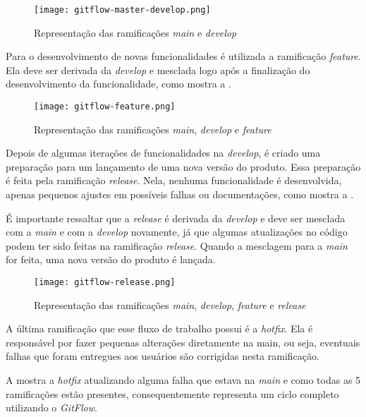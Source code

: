 \begin{figure}[!htb]
    \centering
    \texttt{[image: gitflow-master-develop.png]}
    \caption{Representação das ramificações \textit{main} e \textit{develop}}
    \label{fig:gitflow1}
\end{figure}

Para o desenvolvimento de novas funcionalidades é utilizada a ramificação \textit{feature}. Ela deve ser derivada da \textit{develop} e mesclada logo após a finalização do desenvolvimento da funcionalidade, como mostra a .

\begin{figure}[!htb]
    \centering
    \texttt{[image: gitflow-feature.png]}
    \caption{Representação das ramificações \textit{main}, \textit{develop} e \textit{feature}}
    \label{fig:gitflow2}
\end{figure}

Depois de algumas iterações de funcionalidades na \textit{develop}, é criado uma preparação para um lançamento de uma nova versão do produto. Essa preparação é feita pela ramificação \textit{release}. Nela, nenhuma funcionalidade é desenvolvida, apenas pequenos ajustes em possíveis falhas ou documentações, como mostra a .

É importante ressaltar que a \textit{release} é derivada da \textit{develop} e deve ser mesclada com a \textit{main} e com a  \textit{develop} novamente, já que algumas atualizações no código podem ter sido feitas na ramificação \textit{release}. Quando a mesclagem para a \textit{main} for feita, uma nova versão do produto é lançada.

\begin{figure}[!htb]
    \centering
    \texttt{[image: gitflow-release.png]}
    \caption{Representação das ramificações \textit{main}, \textit{develop}, \textit{feature} e \textit{release}}
    \label{fig:gitflow3}
\end{figure}

A última ramificação que esse fluxo de trabalho possui é a \textit{hotfix}. Ela é responsável por fazer pequenas alterações diretamente na main, ou seja, eventuais falhas que foram entregues aos usuários são corrigidas nesta ramificação.

A   mostra a \textit{hotfix} atualizando alguma falha que estava na \textit{main} e como todas as 5 ramificações estão presentes, consequentemente representa um ciclo completo utilizando o \textit{GitFlow}.

